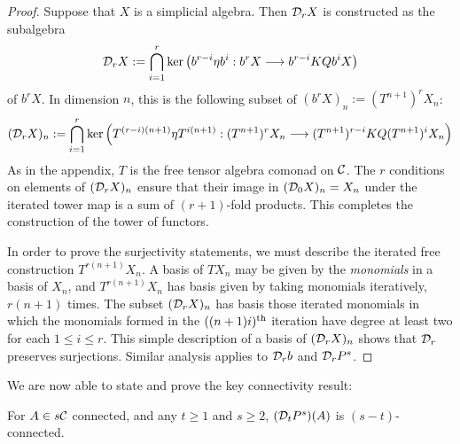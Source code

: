 \documentclass[11pt]{amsart}
\theoremstyle{plain}
\newcommand{\Comm}{\calC}
\newcommand{\caldup}[1]{\calD_{\smash{#1}}}
\begin{document}
\begin{proof}

Suppose that $X$ is a simplicial algebra. Then $\caldup{r}X$
is constructed as the subalgebra
\[\caldup{r}X:= \bigcap_{i=1}^{r}\ker\!\left(b^{r-i}\eta b^{i}:b^{r}X\to b^{r-i}KQb^{i}X\right)\]
of $b^rX$. In dimension $n$, this is the following subset of $(b^rX)_n:=(T^{n+1})^rX_n$:
\[(\caldup{r}X)_n:=\bigcap_{i=1}^{r}\ker\!\left(T^{(r-i)(n+1)}\eta T^{i(n+1)}:(T^{n+1})^rX_n\to (T^{n+1})^{r-i}KQ(T^{n+1})^iX_n\right)\]
As in the appendix, $T$ is the free tensor algebra comonad on $\mathcal{C}$.
The $r$ conditions on elements of $(\caldup{r}X)_n$ ensure that their image in $(\caldup{0}X)_n=X_n$ under the iterated tower map is a sum of $(r+1)$-fold products. This completes the construction of the tower of functors.

In order to prove the surjectivity statements, we must describe the iterated free construction $T^{r(n+1)}X_n$. A basis of $TX_n$ may be given by the \emph{monomials} in a basis of $X_n$, and $T^{r(n+1)}X_n$ has basis given by taking monomials iteratively, $r(n+1)$ times. The subset $(\caldup{r}X)_n$ has basis those iterated monomials in which the monomials formed in the $((n+1)i)^\textup{th}$ iteration have degree at least two for each $1\leq i\leq r$. This simple description of a basis of $(\caldup{r}X)_n$ shows that $\caldup{r}$ preserves surjections. Similar analysis applies to $\caldup{r}b$ and $\caldup{r}P^s$.
\end{proof}
We are now able to state and prove the key connectivity result:
\begin{lem}\label{connectivityOfDerivedPowers}
For $A\in s\Comm$ connected, and any $t\geq1$ and $s\geq2$, $(\caldup{t}P^{s})(A)$ is $(s-t)$-connected.
\end{lem}
\end{document}
